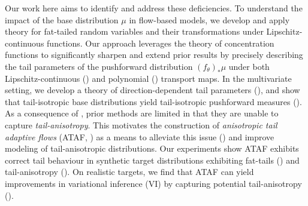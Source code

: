 \documentclass[twoside]{article}
\theoremstyle{definition}
\theoremstyle{remark}
\begin{document}
Our work here aims to identify and address these deficiencies.
To understand the impact of the base distribution $\mu$ in flow-based models,
we develop and apply theory for fat-tailed random variables and their transformations under Lipschitz-continuous functions.
Our approach leverages the theory of concentration functions \citep[Chapter 1.2]{ledoux2001concentration} to significantly sharpen and extend prior results
\citep[Theorem 4]{jaini2019sum} by precisely describing the tail parameters of the pushforward distribution $(f_\theta)_\ast \mu$ under both Lipschitz-continuous () and polynomial () transport maps.
In the multivariate setting,
we develop a theory of direction-dependent tail parameters (), and show that tail-isotropic base distributions yield tail-isotropic pushforward measures (). 
As a consequence of , prior methods \citep{jaini2020tails} are limited in that
they are unable to capture \emph{tail-anisotropy}.
This motivates the construction of \emph{anisotropic tail adaptive flows} (ATAF, ) as a means to
alleviate this issue () and improve modeling of tail-anisotropic distributions.
Our experiments show ATAF exhibits correct tail behaviour in synthetic target distributions exhibiting fat-tails () and tail-anisotropy ().
On realistic targets,
we find that ATAF can yield improvements in variational inference (VI) by capturing potential tail-anisotropy ().
\vspace{-3mm}
\end{document}
